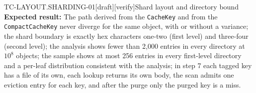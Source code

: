 \begin{requirement}{TC-LAYOUT.SHARDING-01}[draft][verify]{Shard layout and directory bound}
  \textbf{Expected result:} The path derived from the \texttt{CacheKey} and
  from the \texttt{CompactCacheKey} never diverge for the same object, with or
  without a variance; the shard boundary is exactly hex characters one-two
  (first level) and three-four (second level); the analysis shows fewer than
  2,000 entries in every directory at $10^8$ objects; the sample shows at most
  256 entries in every first-level directory and a per-leaf distribution
  consistent with the analysis; in step 7 each tagged key has a file of its
  own, each lookup returns its own body, the scan admits one eviction entry
  for each key, and after the purge only the purged key is a miss.



\end{requirement}


